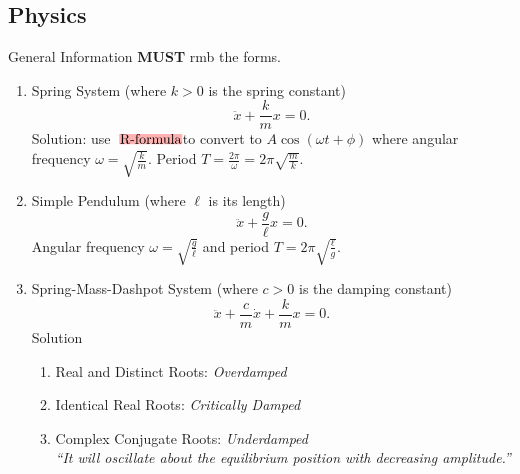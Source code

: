 \documentclass[oneside]{book}
\newcommand{\highlight}[2][red!50]{\mathpalette{\highlightwithstyle[#1]}{#2}}
\newcommand{\highlightwithstyle}[3][red!50]{
  \begingroup                         %
    \sbox0{$\mathsurround 0pt #2#3$}%
    \setlength{\fboxsep}{.5pt}        %
    \sbox2{\hspace{-.5pt}%
      \colorbox{#1}{\usebox0}%
    }%
    \dp2=\dp0 \ht2=\ht0 \wd2=\wd0     %
    \box2                             %
  \endgroup                           %
}
\begin{document}
\subsection{Physics}
\begin{stbox}{General Information}
  \textbf{MUST} rmb the forms.
  \begin{enumerate}
    \item Spring System (where \(k>0\) is the spring constant) 
    \[\ddot{x}+\frac{k}{m}x=0.\]
    Solution: use \(\highlight[red!30]{\text{R-formula}}\) to convert to \(A \cos(\omega t + \phi)\) where angular frequency \(\omega=\sqrt{\frac{k}{m}}\). Period \(T=\frac{2\pi}{\omega}=2\pi \sqrt{\frac{m}{k}}\).
    \item Simple Pendulum (where \(\ell\) is its length)
    \[\ddot{x}+\frac{g}{\ell}x=0.\]
    Angular frequency \(\omega=\sqrt{\frac{g}{\ell}}\) and period \(T=2\pi \sqrt{\frac{\ell}{g}}\).
    \item Spring-Mass-Dashpot System (where \(c>0\) is the damping constant)
    \[\ddot{x}+\frac{c}{m}\dot{x}+\frac{k}{m}x=0.\]
    Solution
    \begin{enumerate}
      \item Real and Distinct Roots: \emph{Overdamped}
      \item Identical Real Roots: \emph{Critically Damped}
      \item Complex Conjugate Roots: \emph{Underdamped}\\
      \emph{``It will oscillate about the equilibrium position with decreasing amplitude.''}
    \end{enumerate}
  \end{enumerate}
\end{stbox}
\begin{center}
  
\end{center}
\end{document}
